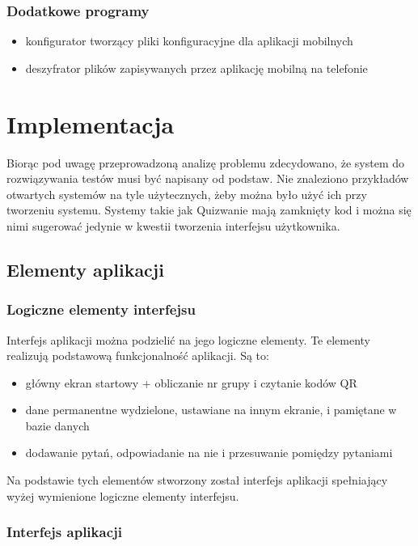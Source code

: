 \documentclass[archivemod, eng]{mgr}
\begin{document}
			\subsection{Dodatkowe programy}
			\begin{itemize}
				\item konfigurator tworzący pliki konfiguracyjne dla aplikacji mobilnych
				\item deszyfrator plików zapisywanych przez aplikację mobilną na telefonie
			\end{itemize}
	
	\chapter{Implementacja}
	
	Biorąc pod uwagę przeprowadzoną analizę problemu zdecydowano, że system do rozwiązywania testów musi być napisany od podstaw. Nie znaleziono przykładów otwartych systemów na tyle użytecznych, żeby można było użyć ich przy tworzeniu systemu. Systemy takie jak Quizwanie mają zamknięty kod i można się nimi sugerować jedynie w kwestii tworzenia interfejsu użytkownika.
	
		\section{Elementy aplikacji}
		
			\subsection{Logiczne elementy interfejsu}
			
			Interfejs aplikacji można podzielić na jego logiczne elementy. Te elementy realizują podstawową funkcjonalność aplikacji. Są to:
			\begin{itemize}
				\item główny ekran startowy + obliczanie nr grupy i czytanie kodów QR
				\item dane permanentne wydzielone, ustawiane na innym ekranie, i pamiętane w bazie danych
				\item dodawanie pytań, odpowiadanie na nie i przesuwanie pomiędzy pytaniami
			\end{itemize}
			Na podstawie tych elementów stworzony został interfejs aplikacji spełniający wyżej wymienione logiczne elementy interfejsu.
	
			\subsection{Interfejs aplikacji}
		
\end{document}
